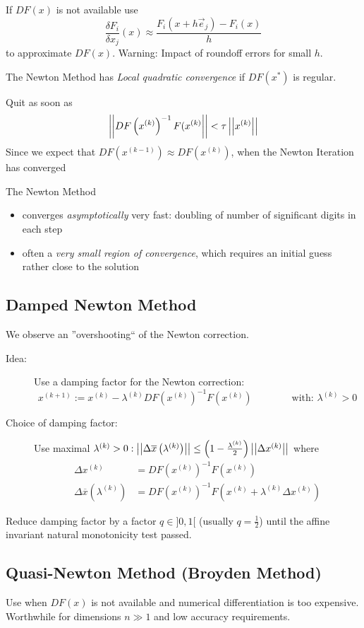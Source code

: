 		If $DF(x)$ is not available use
			\[
			 \frac{\delta F_i}{\delta x_j}(x) \approx \frac{F_i(x + h \vec e_j)-F_i(x)}{h}
			\]
		to approximate $DF(x)$. Warning: Impact of roundoff errors for small $h$.
		\begin{notice}
		 The Newton Method has \emph{Local quadratic convergence} if $DF(x^*)$ is regular.
		\end{notice}
		\begin{notice} 
			Quit as soon as
			  \[ 
			   \left|\left| DF\left(x^{(k)}\right)^{-1}F(x^{(k)} \right|\right| < \tau \left|\left| x^{(k)} \right|\right|
			  \]
				Since we expect that $DF\left(x^{(k-1)}\right) \approx DF\left(x^{(k)}\right)$, when the Newton Iteration has converged
		\end{notice}
		The Newton Method
		\begin{itemize}
		 \item converges \emph{asymptotically} very fast: doubling of number of significant digits in each step
		 \item often a \emph{very small region of convergence}, which requires an initial guess rather close to the solution
		\end{itemize}
	\subsection{Damped Newton Method}
		We observe an ''overshooting`` of the Newton correction.
		\begin{description}
		 \item[Idea:] Use a damping factor for the Newton correction:
		 \[
		  x^{(k+1)} := x^{(k)} - \lambda^{(k)} DF\left(x^{(k)}\right)^{-1}F \left(x^{(k)}\right) \qquad \qquad \text{with: } \lambda^{(k)} > 0
		 \]
		 \item[Choice of damping factor:] Use maximal $\lambda^{(k)} > 0: \left|\left| \Delta \overline{x} \left( \lambda^{(k)}\right)  \right|\right| \leq \left( 1 -\frac{\lambda^{(k)}}{2} \right) \left|\left| \Delta x^{(k)} \right|\right|$ where
		 \begin{align*}
			\Delta x^{(k)} &= DF\left(x^{(k)}\right)^{-1} F\left(x^{(k)} \right)\\
			\Delta \overline{x}\left(\lambda^{(k)}\right) &= DF\left(x^{(k)}\right)^{-1} F\left(x^{(k)}+\lambda^{(k)}\Delta x^{(k)}\right)
		 \end{align*}
		\end{description}
		\begin{notice}[Policy] 
		 Reduce damping factor by a factor $q \in ]0,1[$ (usually $q= \tfrac{1}{2}
		 $) until the affine invariant natural monotonicity test passed.
		\end{notice}
	\subsection{Quasi-Newton Method (Broyden Method)}
		Use when $DF(x)$ is not available and numerical differentiation is too expensive.\\
		Worthwhile for dimensions $n\gg 1$ and low accuracy requirements.
		
